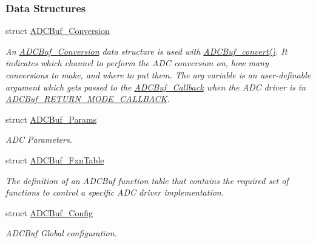 \subsubsection*{Data Structures}
\begin{DoxyCompactItemize}
\item 
struct \hyperlink{struct_a_d_c_buf___conversion}{A\+D\+C\+Buf\+\_\+\+Conversion}
\begin{DoxyCompactList}\small\item\em An \hyperlink{struct_a_d_c_buf___conversion}{A\+D\+C\+Buf\+\_\+\+Conversion} data structure is used with \hyperlink{_a_d_c_buf_8h_a762253a94875258c5a71b591f03f9d97}{A\+D\+C\+Buf\+\_\+convert()}. It indicates which channel to perform the A\+D\+C conversion on, how many conversions to make, and where to put them. The arg variable is an user-\/definable argument which gets passed to the \hyperlink{_a_d_c_buf_8h_a477c377c65f8de04aa67ff7eefa0a4cf}{A\+D\+C\+Buf\+\_\+\+Callback} when the A\+D\+C driver is in \hyperlink{_a_d_c_buf_8h_a3d643e8024503c5ef2679c83419ba6eea633b4b063b88d7c62e9e2513075a36a7}{A\+D\+C\+Buf\+\_\+\+R\+E\+T\+U\+R\+N\+\_\+\+M\+O\+D\+E\+\_\+\+C\+A\+L\+L\+B\+A\+C\+K}. \end{DoxyCompactList}\item 
struct \hyperlink{struct_a_d_c_buf___params}{A\+D\+C\+Buf\+\_\+\+Params}
\begin{DoxyCompactList}\small\item\em A\+D\+C Parameters. \end{DoxyCompactList}\item 
struct \hyperlink{struct_a_d_c_buf___fxn_table}{A\+D\+C\+Buf\+\_\+\+Fxn\+Table}
\begin{DoxyCompactList}\small\item\em The definition of an A\+D\+C\+Buf function table that contains the required set of functions to control a specific A\+D\+C driver implementation. \end{DoxyCompactList}\item 
struct \hyperlink{struct_a_d_c_buf___config}{A\+D\+C\+Buf\+\_\+\+Config}
\begin{DoxyCompactList}\small\item\em A\+D\+C\+Buf Global configuration. \end{DoxyCompactList}\end{DoxyCompactItemize}
